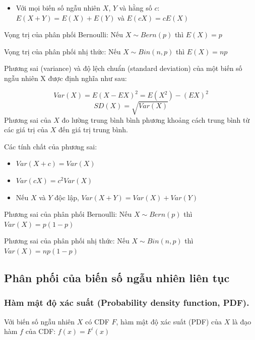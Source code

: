 \documentclass[
]{book}
\providecommand{\tightlist}{%
  \setlength{\itemsep}{0pt}\setlength{\parskip}{0pt}}
\begin{document}
\begin{itemize}
\tightlist
\item
  Với mọi biến số ngẫu nhiên \(X\), \(Y\) và hằng số \(c\): \(E(X + Y) = E(X) + E(Y)\) và \(E(cX) = c E(X)\)
\end{itemize}

Vọng trị của phân phối Bernoulli: Nếu \(X \sim Bern(p)\) thì \(E(X) = p\)

Vọng trị của phân phối nhị thức: Nếu \(X \sim Bin(n, p)\) thì \(E(X) = np\)

Phương sai (variance) và độ lệch chuẩn (standard deviation) của một biến số ngẫu nhiên X được định nghĩa như sau:

\[
Var(X) = E(X - EX)^2 = E(X^2) - (EX)^2
\]
\[
SD(X) = \sqrt{Var(X)}
\]
Phương sai của \(X\) đo lường trung bình bình phương khoảng cách trung bình từ các giá trị của \(X\) đến giá trị trung bình.

Các tính chất của phương sai:

\begin{itemize}
\tightlist
\item
  \(Var(X + c) = Var(X)\)
\item
  \(Var(cX) = c^2 Var(X)\)
\item
  Nếu \(X\) và \(Y\) độc lập, \(Var(X + Y) = Var(X) + Var(Y)\)
\end{itemize}

Phương sai của phân phối Bernoulli: Nếu \(X \sim Bern(p)\) thì \(Var(X) = p(1-p)\)

Phương sai của phân phối nhị thức: Nếu \(X \sim Bin(n, p)\) thì \(Var(X) = np(1-p)\)

\hypertarget{phuxe2n-phux1ed1i-cux1ee7a-biux1ebfn-sux1ed1-ngux1eabu-nhiuxean-liuxean-tux1ee5c}{%
\subsection{Phân phối của biến số ngẫu nhiên liên tục}\label{phuxe2n-phux1ed1i-cux1ee7a-biux1ebfn-sux1ed1-ngux1eabu-nhiuxean-liuxean-tux1ee5c}}

\hypertarget{huxe0m-mux1eadt-ux111ux1ed9-xuxe1c-suux1ea5t-probability-density-function-pdf.}{%
\subsubsection{Hàm mật độ xác suất (Probability density function, PDF).}\label{huxe0m-mux1eadt-ux111ux1ed9-xuxe1c-suux1ea5t-probability-density-function-pdf.}}

Với biến số ngẫu nhiên \(X\) có CDF \(F\), hàm mật độ xác suất (PDF) của \(X\) là đạo hàm \(f\) của CDF: \(f(x) = F^\prime(x)\)
\end{document}
